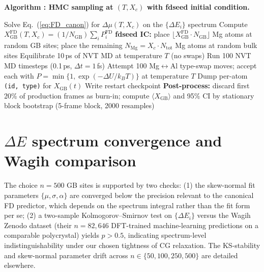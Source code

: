 \label{alg:hmc}%
\noindent\textbf{Algorithm \thealgorithm: HMC sampling at $(T, X_c)$ with
fdseed initial condition.}\\[2pt]
\begin{algorithmic}[1]
\State Solve Eq.~(\ref{eq:FD_canon}) for $\Delta\mu(T, X_c)$ on the
       $\{\Delta E_i\}$ spectrum
\State Compute $X_\mathrm{GB}^\mathrm{FD}(T, X_c) = (1/N_\mathrm{GB})
       \sum_i P_i^\mathrm{FD}$
\State \textbf{fdseed IC:} place $\lfloor X_\mathrm{GB}^\mathrm{FD}
       \cdot N_\mathrm{GB} \rfloor$ Mg atoms at random GB sites; place
       the remaining $N_\mathrm{Mg} = X_c \cdot N_\mathrm{tot}$ Mg
       atoms at random bulk sites
\State Equilibrate 10\,ps of NVT MD at temperature $T$ (no swaps)
    \State Run 100 NVT MD timesteps (0.1\,ps, $\Delta t = 1$\,fs)
    \State Attempt 100 Mg$\leftrightarrow$Al type-swap moves; accept each
           with $P=\min\{1, \exp(-\Delta U/k_B T)\}$ at temperature $T$
     
        \State Dump per-atom \texttt{(id, type)} for $X_\mathrm{GB}(t)$
    \EndIf
     
        \State Write restart checkpoint
    \EndIf
\EndFor
\State \textbf{Post-process:} discard first 20\% of production frames as
       burn-in; compute $\langle X_\mathrm{GB}\rangle$ and 95\% CI by
       stationary block bootstrap (5-frame block, 2000 resamples)
\end{algorithmic}


\section{$\Delta E$ spectrum convergence and Wagih comparison}\label{app:dE_compare}

The choice $n = 500$ GB sites is supported by two checks:
(1) the skew-normal fit parameters $\{\mu, \sigma, \alpha\}$ are
converged below the precision relevant to the canonical FD predictor,
which depends on the spectrum integral rather than the fit form per
se; (2) a two-sample Kolmogorov--Smirnov test on $\{\Delta E_i\}$
versus the Wagih Zenodo dataset (their $n = 82{,}646$ DFT-trained
machine-learning predictions on a comparable polycrystal) yields
$p > 0.5$, indicating spectrum-level indistinguishability under our
chosen tightness of CG relaxation. The KS-stability and skew-normal
parameter drift across $n \in \{50, 100, 250, 500\}$ are detailed
elsewhere.
